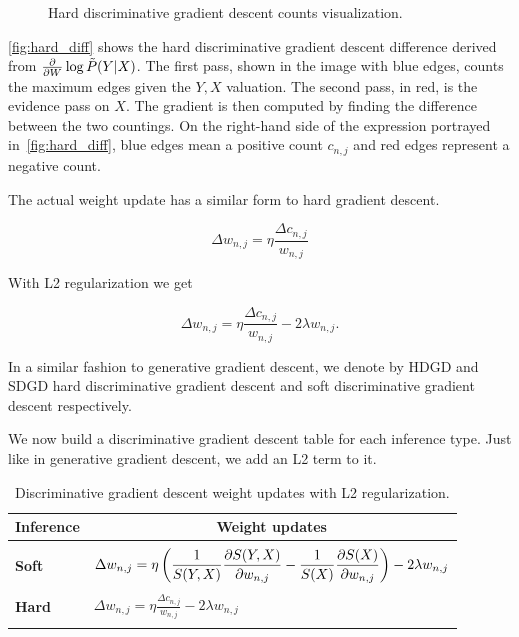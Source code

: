 \begin{figure}[h]
\begin{minipage}{0.3\textwidth}
    \caption*{$\nabla\log\tilde{P}(Y|X)$}
  \end{minipage}
  \caption{Hard discriminative gradient descent counts visualization.\label{fig:hard_diff}}
\end{figure}

\autoref{fig:hard_diff} shows the hard discriminative gradient descent difference derived from
$\frac{\partial}{\partial W}\log\tilde{P}(Y|X)$. The first pass, shown in the image with blue edges, counts the
maximum edges given the $Y,X$ valuation. The second pass, in red, is the evidence pass on $X$. The
gradient is then computed by finding the difference between the two countings. On the right-hand
side of the expression portrayed in~\autoref{fig:hard_diff}, blue edges mean a positive count
$c_{n,j}$ and red edges represent a negative count.

The actual weight update has a similar form to hard gradient descent.

\begin{equation*}
  \Delta w_{n,j}=\eta\frac{\Delta c_{n,j}}{w_{n,j}}
\end{equation*}

With L2 regularization we get

\begin{equation}
  \Delta w_{n,j}=\eta\frac{\Delta c_{n,j}}{w_{n,j}}-2\lambda w_{n,j}.
\end{equation}

In a similar fashion to generative gradient descent, we denote by HDGD and SDGD hard discriminative
gradient descent and soft discriminative gradient descent respectively.

We now build a discriminative gradient descent table for each inference type. Just like in
generative gradient descent, we add an L2 term to it.

\begin{table}[h]
  \centering
  \begin{tabular}{l|l}
    \hline
    \multicolumn{1}{c}{\bfseries Inference} & \multicolumn{1}{c}{\bfseries Weight updates}\\
    \hline & \\
    \textbf{Soft} & \(\displaystyle \Delta
      w_{n,j}=\eta\left(\frac{1}{S(Y,X)}\frac{\partial S(Y,X)}{\partial w_{n,j}}-\frac{1}{S(X)}
        \frac{\partial S(X)}{\partial w_{n,j}}\right)-2\lambda w_{n,j} \) \\
    & \\
    \textbf{Hard} & \(\displaystyle \Delta w_{n,j}=\eta\frac{\Delta c_{n,j}}{w_{n,j}}-2\lambda w_{n,j} \) \\
    & \\
    \hline
  \end{tabular}
  \caption{Discriminative gradient descent weight updates with L2
    regularization.\label{tab:discriminative_weight_updates}}
\end{table}

